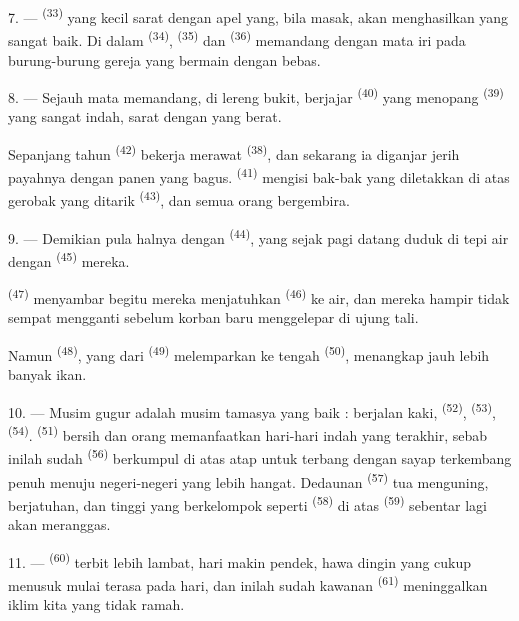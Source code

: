 7. ---  \textsuperscript{(33)} yang kecil sarat
dengan apel yang, bila masak, akan menghasilkan 
yang sangat baik. Di dalam  \textsuperscript{(34)},
 \textsuperscript{(35)} dan  \textsuperscript{(36)} memandang dengan mata iri pada
burung-burung gereja yang bermain dengan bebas.

8. --- Sejauh mata memandang, di lereng bukit, berjajar
 \textsuperscript{(40)} yang menopang
 \textsuperscript{(39)} yang sangat indah, sarat dengan
 yang berat.

Sepanjang tahun  \textsuperscript{(42)} bekerja
merawat  \textsuperscript{(38)}, dan sekarang
ia diganjar jerih payahnya dengan panen yang bagus.  \textsuperscript{(41)} mengisi bak-bak yang
diletakkan di atas gerobak yang ditarik 
\textsuperscript{(43)}, dan semua orang bergembira.

\VUsaut{5.0mm}
\VUsaut{3.4mm}

9. --- Demikian pula halnya dengan 
\textsuperscript{(44)}, yang sejak pagi datang duduk di tepi air dengan
 \textsuperscript{(45)} mereka.

 \textsuperscript{(47)} menyambar 
begitu mereka menjatuhkan 
\textsuperscript{(46)} ke air, dan mereka hampir tidak sempat mengganti
 sebelum korban baru menggelepar di ujung tali.

Namun  \textsuperscript{(48)}, yang dari
 \textsuperscript{(49)} melemparkan  ke tengah  \textsuperscript{(50)}, menangkap jauh
lebih banyak ikan.

10. --- Musim gugur adalah musim tamasya yang baik : berjalan kaki,
 \textsuperscript{(52)}, 
\textsuperscript{(53)},  \textsuperscript{(54)}.
 \textsuperscript{(51)} bersih dan orang
memanfaatkan hari-hari indah yang terakhir, sebab inilah sudah
 \textsuperscript{(56)} berkumpul di
atas atap untuk terbang dengan sayap terkembang penuh menuju
negeri-negeri yang lebih hangat. Dedaunan 
\textsuperscript{(57)} tua menguning,  berjatuhan,
dan  tinggi yang berkelompok seperti 
\textsuperscript{(58)} di atas  \textsuperscript{(59)}
sebentar lagi akan meranggas.

11. ---  \textsuperscript{(60)} terbit lebih lambat,
hari makin pendek, hawa dingin yang cukup menusuk mulai terasa pada
 hari, dan inilah sudah kawanan 
\textsuperscript{(61)} meninggalkan iklim kita yang tidak ramah.

\VUsaut{6.0mm}
\VUfilet{22mm}
